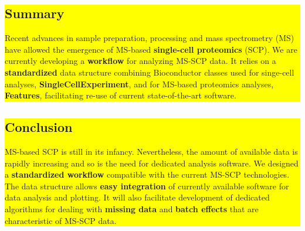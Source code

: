 \documentclass{article}
\newcommand{\hcode}[2][lgray]{{\ttfamily\color{vdgray}\colorbox{#1}{#2}}}
\begin{document}
\noindent
\colorbox{yellow}{
  \noindent
  \begin{minipage}[t]{13.7cm}
  \vspace{.15cm}
    \section*{\huge Summary}
    \large 
    Recent advances in sample preparation, processing and mass spectrometry (MS) have allowed the emergence of MS-based \textbf{single-cell proteomics} (SCP). We are currently developing a \textbf{workflow} for analyzing MS-SCP data. It relies on a \textbf{standardized} data structure combining Bioconductor classes used for singe-cell analyses, \textbf{\hcode[yellow]{SingleCellExperiment}}\cite{SCE}, and for MS-based proteomics analyses, \textbf{\hcode[yellow]{Features}}\cite{Features}, facilitating re-use of current state-of-the-art software.
    \vspace{0.1cm}
  \end{minipage}
}
\hspace{0.37cm}
\noindent
\colorbox{yellow}{
  \begin{minipage}[t]{13.6cm}
    \vspace{.2cm}
    \section*{\huge Conclusion}
    \large
    MS-based SCP is still in its infancy. Nevertheless, the amount of available data is rapidly increasing and so is the need for dedicated analysis software. We designed a \textbf{standardized workflow} compatible with the current MS-SCP technologies. The data structure allows \textbf{easy integration} of currently available software for data analysis and plotting. It will also facilitate development of dedicated algorithms for dealing with \textbf{missing data} and \textbf{batch effects} that are characteristic of MS-SCP data.
    \vspace{0.15cm}
 \end{minipage}
}
\vspace{-1cm}
\end{document}
